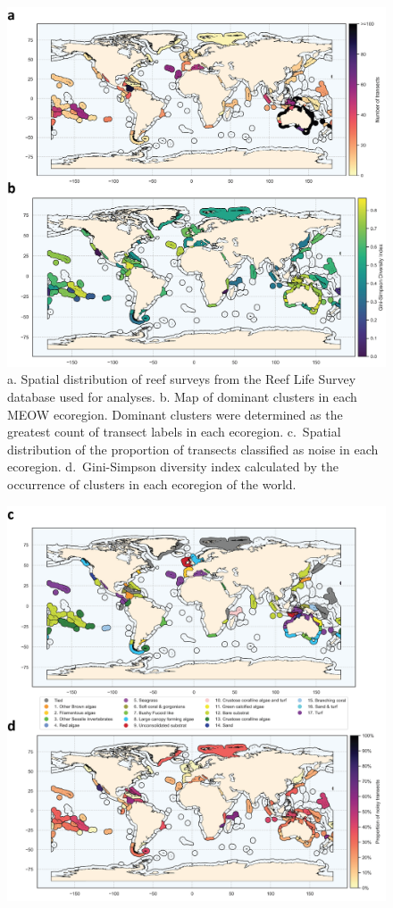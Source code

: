 \begin{refsection}
\begin{figure}
\hypertarget{fig:chap2fig4}{%
\centering
\includegraphics{03-Chapitre2/figures/fig4_ab.png}
\caption{a. Spatial distribution of reef surveys from the Reef Life
Survey database used for analyses. b. Map of dominant clusters in each
MEOW ecoregion. Dominant clusters were determined as the greatest count
of transect labels in each ecoregion. c.~Spatial distribution of the
proportion of transects classified as noise in each ecoregion.
d.~Gini-Simpson diversity index calculated by the occurrence of clusters
in each ecoregion of the world.}\label{fig:chap2fig4}
}
\end{figure}
\begin{figure}
\ContinuedFloat
\centering
\includegraphics{03-Chapitre2/figures/fig4_cd.png}

\end{figure}
\end{refsection}
